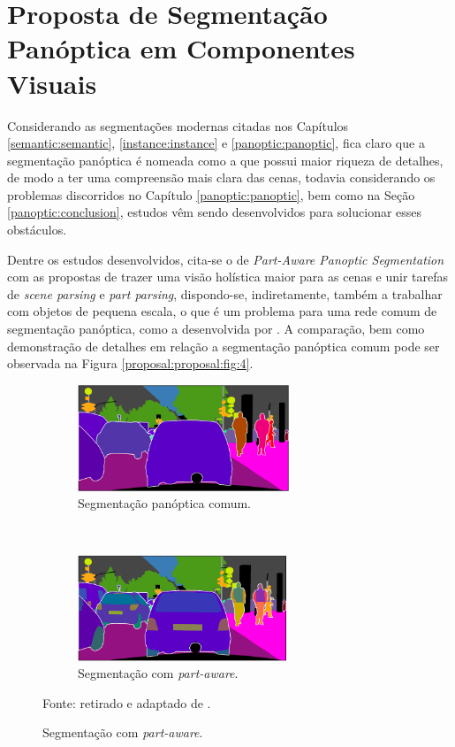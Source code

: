 \newpage
\clearpage

\section{Proposta de Segmentação Panóptica em Componentes Visuais}
\label{proposal:proposal}

Considerando as segmentações modernas citadas nos Capítulos \ref{semantic:semantic}, \ref{instance:instance} e \ref{panoptic:panoptic}, fica claro que a segmentação panóptica é nomeada como a que possui maior riqueza de detalhes, de modo a ter uma compreensão mais clara das cenas, todavia considerando os problemas discorridos no Capítulo \ref{panoptic:panoptic}, bem como na Seção \ref{panoptic:conclusion}, estudos vêm sendo desenvolvidos para solucionar esses obstáculos.

\begin{sloppypar}
Dentre os estudos desenvolvidos, cita-se o de \textit{Part-Aware Panoptic Segmentation} \cite{DeGeus2021} com as propostas de trazer uma visão holística maior para as cenas e unir tarefas de \textit{scene parsing} e \textit{part parsing}, dispondo-se, indiretamente, também a trabalhar com objetos de pequena escala, o que é um problema para uma rede comum de segmentação panóptica, como a desenvolvida por \cite{Kirillov2019a}. A comparação, bem como demonstração de detalhes em relação a segmentação panóptica comum pode ser observada na Figura \ref{proposal:proposal:fig:4}.
\end{sloppypar}

\begin{figure}[H]
   \caption{Segmentação Panóptica e \textit{Part-Aware}.}
   \centering
   \label{proposal:proposal:fig:4}
    \begin{subfigure}[t]{0.4\textwidth}
        \centering
        \includegraphics[height=1.25in]{recursos/imagens/proposal/pano_vs.png}
        \caption{Segmentação panóptica comum.}
        \label{proposal:proposal:fig:4.1}
    \end{subfigure}%
    ~ 
    \begin{subfigure}[t]{0.4\textwidth}
        \centering
        \includegraphics[height=1.25in]{recursos/imagens/proposal/part_pano_vs.png}
        \caption{Segmentação com \textit{part-aware}.}
        \label{proposal:proposal:fig:4.2}
    \end{subfigure}%

    Fonte: retirado e adaptado de \cite{DeGeus2021}.
\end{figure}

